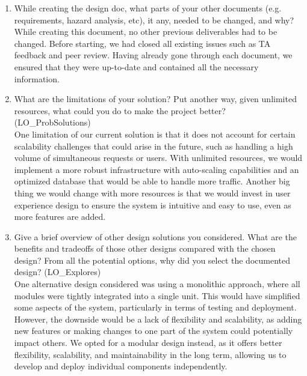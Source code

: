 \documentclass[12pt, titlepage]{article}
\begin{document}
\begin{enumerate}
  
  \item While creating the design doc, what parts of your other documents (e.g.
  requirements, hazard analysis, etc), it any, needed to be changed, and why?\\
While creating this document, no other previous deliverables had to be changed. Before starting, we had closed all existing issues such as TA feedback and peer review. Having already gone through each document, we ensured that they were up-to-date and contained all the necessary information.
  
  \item What are the limitations of your solution?  Put another way, given
  unlimited resources, what could you do to make the project better? (LO\_ProbSolutions)\\
One limitation of our current solution is that it does not account for certain scalability challenges that could arise in the future, such as handling a high volume of simultaneous requests or users. With unlimited resources, we would implement a more robust infrastructure with auto-scaling capabilities and an optimized database that would be able to handle more traffic. Another big thing we would change with more resources is that we would invest in user experience design to ensure the system is intuitive and easy to use, even as more features are added.

  \item Give a brief overview of other design solutions you considered.  What
  are the benefits and tradeoffs of those other designs compared with the chosen
  design?  From all the potential options, why did you select the documented design?
  (LO\_Explores)\\
One alternative design considered was using a monolithic approach, where all modules were tightly integrated into a single unit. This would have simplified some aspects of the system, particularly in terms of testing and deployment. However, the downside would be a lack of flexibility and scalability, as adding new features or making changes to one part of the system could potentially impact others. We opted for a modular design instead, as it offers better flexibility, scalability, and maintainability in the long term, allowing us to develop and deploy individual components independently.
\end{enumerate}
\end{document}
